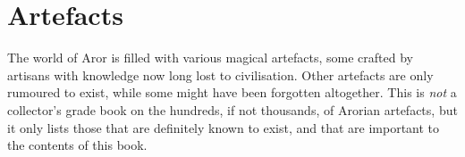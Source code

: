 \section{Artefacts}
\label{sec:Artefacts}

The world of Aror is filled with various magical artefacts, some crafted by
artisans with knowledge now long lost to civilisation. Other artefacts are
only rumoured to exist, while some might have been forgotten altogether. This
is \emph{not} a collector's grade book on the hundreds, if not thousands, of
Arorian artefacts, but it only lists those that are definitely known to exist,
and that are important to the contents of this book.




